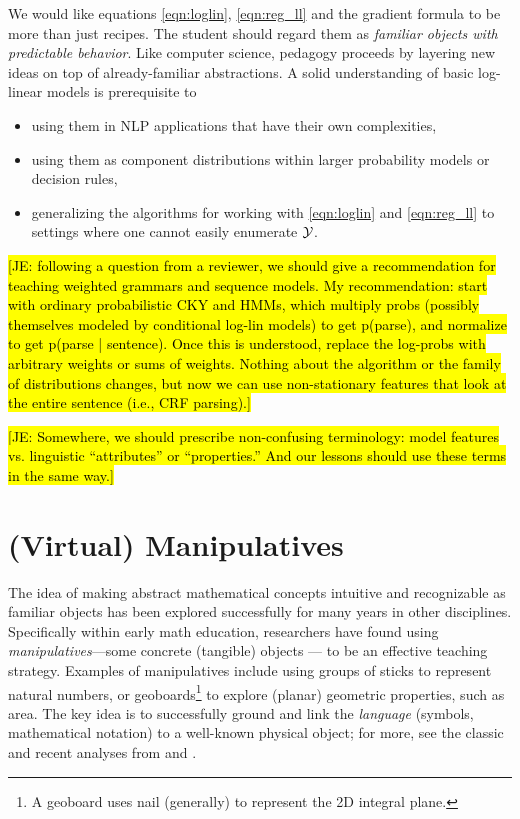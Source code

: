 \documentclass[11pt,letterpaper]{article}
\newcommand{\Note}[1]{}
\renewcommand{\Note}[1]{\hl{[#1]}}  %
\newcommand{\NoteSigned}[3]{{\sethlcolor{#2}\Note{#1: #3}}}
\newcommand{\NoteJE}[1]{\NoteSigned{JE}{LightGreen}{#1}}
\begin{document}
We would like equations \eqref{eqn:loglin}, \eqref{eqn:reg_ll} and the
gradient formula to be more than just recipes.  The student should
regard them as {\em familiar objects with predictable behavior}.  Like
computer science, pedagogy proceeds by layering new ideas on top of
already-familiar abstractions.  A solid understanding of basic
log-linear models is prerequisite to 
\begin{itemize}
\item using them in NLP applications that have their own complexities, 
\item using them as component distributions within larger probability
  models or decision rules,
\item generalizing the algorithms for working with \eqref{eqn:loglin}
  and \eqref{eqn:reg_ll} to settings where one cannot easily enumerate
  ${\cal Y}$.
\end{itemize}

\NoteJE{following a question from a reviewer, we should give a
  recommendation for teaching weighted grammars and sequence models.
  My recommendation: start with ordinary probabilistic CKY and HMMs,
  which multiply probs (possibly themselves modeled by conditional
  log-lin models) to get p(parse), and normalize to get p(parse |
  sentence).  Once this is understood, replace the log-probs with
  arbitrary weights or sums of weights.  Nothing about the algorithm
  or the family of distributions changes, but now we can use
  non-stationary features that look at the entire sentence (i.e., CRF
  parsing).}

\NoteJE{Somewhere, we should prescribe non-confusing terminology:
  model features vs.  linguistic ``attributes'' or ``properties.''
  And our lessons should use these terms in the same way.}
  
\section{(Virtual) Manipulatives}
The idea of making abstract mathematical concepts intuitive and recognizable as familiar objects 
has been explored successfully for many years in other disciplines. Specifically within early 
math education, researchers have found using \textit{manipulatives}---some concrete (tangible) 
objects --- to be an effective teaching strategy. Examples of manipulatives include using groups of 
sticks to represent natural numbers, or geoboards\footnote{A geoboard uses nail (generally) to represent 
the 2D integral plane.} to explore (planar) geometric properties, such as area. The key idea is to 
successfully ground and link the \textit{language} (symbols, mathematical notation) to a well-known physical 
object; for more, see the classic and recent analyses from
 and .
\end{document}
